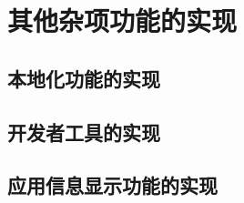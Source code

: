 

\section{其他杂项功能的实现}\label{sec:other}

\subsection{本地化功能的实现}\label{subsec:l10n}


\subsection{开发者工具的实现}\label{subsec:dev-tools}


\subsection{应用信息显示功能的实现}\label{subsec:about}

